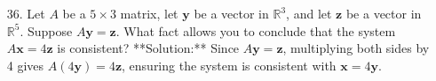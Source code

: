 \documentclass[12pt]{article}
\theoremstyle{definition}
\begin{document}
{\begin{enumerate}
    \item[36.] 
    Let \( A \) be a \( 5 \times 3 \) matrix, let \( \mathbf{y} \) be a vector in \( \mathbb{R}^3 \), and let \( \mathbf{z} \) be a vector in \( \mathbb{R}^5 \). Suppose \( A\mathbf{y} = \mathbf{z} \). What fact allows you to conclude that the system \( A\mathbf{x} = 4\mathbf{z} \) is consistent?
    **Solution:** Since \( A\mathbf{y} = \mathbf{z} \), multiplying both sides by 4 gives \( A(4\mathbf{y}) = 4\mathbf{z} \), ensuring the system is consistent with \( \mathbf{x} = 4\mathbf{y} \).
\end{enumerate}

}
\end{document}
